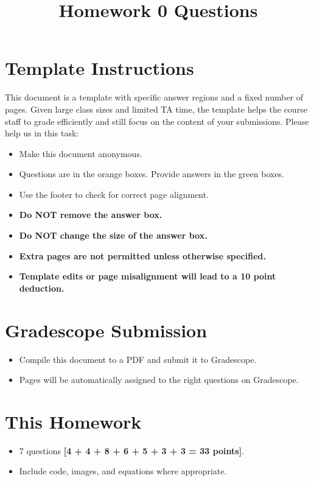\documentclass{csci1430}
\title{\vspace{-1cm}Homework 0 Questions}
\begin{document}
\maketitle
\thispagestyle{fancy}

\section*{Template Instructions}

This document is a template with specific answer regions and a fixed number of pages. Given large class sizes and limited TA time, the template helps the course staff to grade efficiently and still focus on the content of your submissions. Please help us in this task:
 
\begin{itemize}
  \item Make this document anonymous.
  
  \item Questions are in the orange boxes. Provide answers in the green boxes.
  \item Use the footer to check for correct page alignment.

  \item \textbf{Do NOT remove the answer box.}
  \item \textbf{Do NOT change the size of the answer box.}
  \item \textbf{Extra pages are not permitted unless otherwise specified.}
  \item \textbf{Template edits or page misalignment will lead to a 10 point deduction.}
\end{itemize}

\section*{Gradescope Submission}
\begin{itemize}
  \item Compile this document to a PDF and submit it to Gradescope.
  \item Pages will be automatically assigned to the right questions on Gradescope.
\end{itemize}

\section*{This Homework}
\begin{itemize}
  \item 7 questions \textbf{[4 + 4 + 8 + 6 + 5 + 3 + 3 = 33 points]}.
  \item Include code, images, and equations where appropriate.
\end{itemize}
\end{document}
